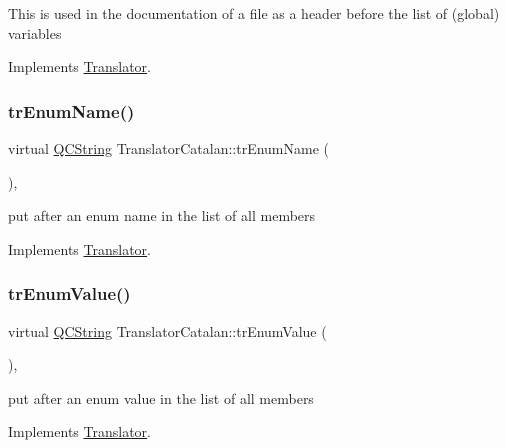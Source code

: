 This is used in the documentation of a file as a header before the list of (global) variables 

Implements \mbox{\hyperlink{class_translator}{Translator}}.

\mbox{\label{class_translator_catalan_af2dfab5ef701aad88325d8696ecac575}} 
\subsubsection{\texorpdfstring{trEnumName()}{trEnumName()}}
{\footnotesize\ttfamily virtual \mbox{\hyperlink{class_q_c_string}{Q\+C\+String}} Translator\+Catalan\+::tr\+Enum\+Name (\begin{DoxyParamCaption}{ }\end{DoxyParamCaption})\hspace{0.3cm}{\ttfamily [inline]}, {\ttfamily [virtual]}}

put after an enum name in the list of all members 

Implements \mbox{\hyperlink{class_translator}{Translator}}.

\mbox{\label{class_translator_catalan_a3a1c4e918d811785acc9d9e9e8495430}} 
\subsubsection{\texorpdfstring{trEnumValue()}{trEnumValue()}}
{\footnotesize\ttfamily virtual \mbox{\hyperlink{class_q_c_string}{Q\+C\+String}} Translator\+Catalan\+::tr\+Enum\+Value (\begin{DoxyParamCaption}{ }\end{DoxyParamCaption})\hspace{0.3cm}{\ttfamily [inline]}, {\ttfamily [virtual]}}

put after an enum value in the list of all members 

Implements \mbox{\hyperlink{class_translator}{Translator}}.

\mbox{\label{class_translator_catalan_a59f96610fe90562d99f00bd609522268}} 

